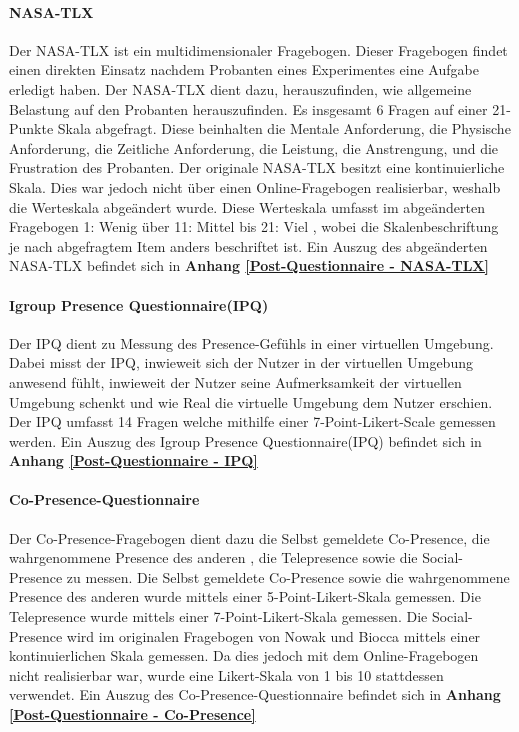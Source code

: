 \documentclass[a4paper,11pt]{article}%
\renewcommand{\\}{\vspace*{0.5\baselineskip} \newline}
\begin{document}
		\paragraph{NASA-TLX}
Der NASA-TLX ist ein multidimensionaler Fragebogen. Dieser Fragebogen findet einen direkten Einsatz nachdem Probanten eines Experimentes eine Aufgabe erledigt haben. Der NASA-TLX dient dazu, herauszufinden, wie allgemeine Belastung auf den Probanten herauszufinden.
Es insgesamt 6 Fragen auf einer 21-Punkte Skala abgefragt. Diese beinhalten die Mentale Anforderung, die Physische Anforderung, die Zeitliche Anforderung, die Leistung, die Anstrengung, und die Frustration des Probanten. \cite{NASATLX}
Der originale NASA-TLX besitzt eine kontinuierliche Skala. Dies war jedoch nicht über einen Online-Fragebogen realisierbar, weshalb die Werteskala abgeändert wurde. Diese Werteskala umfasst im abgeänderten Fragebogen \dq{}1: Wenig \dq{} über \dq{}11: Mittel \dq{} bis \dq{}21: Viel \dq{}, wobei die Skalenbeschriftung je nach abgefragtem Item anders beschriftet ist.
\\Ein Auszug des abgeänderten NASA-TLX befindet sich in \textbf{Anhang \ref{Post-Questionnaire - NASA-TLX}}


		\paragraph{Igroup Presence Questionnaire(IPQ)}
Der IPQ dient zu Messung des Presence-Gefühls in einer virtuellen Umgebung. Dabei misst der IPQ, inwieweit sich der Nutzer in der virtuellen Umgebung anwesend fühlt, inwieweit der Nutzer seine Aufmerksamkeit der virtuellen Umgebung schenkt und wie Real die virtuelle Umgebung dem Nutzer erschien. Der IPQ umfasst 14 Fragen welche mithilfe einer 7-Point-Likert-Scale gemessen werden.
\\Ein Auszug des Igroup Presence Questionnaire(IPQ) befindet sich in \textbf{Anhang \ref{Post-Questionnaire - IPQ}}
		
		\paragraph{Co-Presence-Questionnaire}
Der Co-Presence-Fragebogen dient dazu die Selbst gemeldete Co-Presence, die wahrgenommene Presence des \dq{}anderen \dq{}, die Telepresence sowie die Social-Presence zu messen. Die Selbst gemeldete Co-Presence sowie die wahrgenommene Presence des \dq{}anderen \dq{} wurde mittels einer 5-Point-Likert-Skala gemessen. Die Telepresence wurde mittels einer 7-Point-Likert-Skala gemessen. Die Social-Presence wird im originalen Fragebogen von Nowak und Biocca mittels einer kontinuierlichen Skala gemessen. Da dies jedoch mit dem Online-Fragebogen nicht realisierbar war, wurde eine Likert-Skala von 1 bis 10 stattdessen verwendet. \citep[p.487]{nowak2004effect}
\\Ein Auszug des Co-Presence-Questionnaire befindet sich in \textbf{Anhang \ref{Post-Questionnaire - Co-Presence}}
\end{document}
